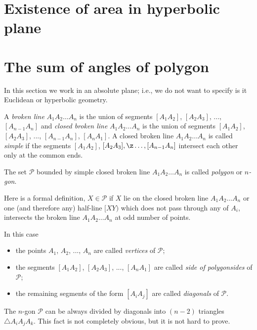 \section*{Existence of area in hyperbolic plane}




\section*{The sum of angles of polygon} 

In this section we work in an absolute plane;
i.e., we do not want to specify is it Euclidean or hyperbolic geometry.

A \emph{broken line} $A_1A_2\dots A_n$
is the union of segments $[A_1A_2]$, $[A_2A_3]$, ..., $[A_{n-1}A_n]$
and  \emph{closed broken line} $A_1A_2\dots A_n$
is the union of segments $[A_1A_2]$, $[A_2A_3]$, ..., $[A_{n-1}A_n]$, $[A_nA_1]$.
A closed broken line  $A_1A_2\dots A_n$ is called \emph{simple} if the segments  $[A_1A_2]$, $[A_2A_3], \z\dots,[A_{n-1}A_n]$ intersect each other only at the common ends.

The set $\mathcal{P}$ bounded by simple closed broken line $A_1A_2\dots A_n$ is called
\emph{polygon} or \emph{$n$-gon}.

Here is a formal definition, $X\in\mathcal{P}$ if $X$ lie on the closed broken line $A_1A_2\dots A_n$ or one (and therefore any) half-line $[XY)$ which does not pass through any of $A_i$, intersects the broken line $A_1A_2\dots A_n$ at odd number of points.

In this case
\begin{itemize}
\item the points $A_1$, $A_2$, ..., $A_n$ are called \emph{vertices} of $\mathcal{P}$;
\item the segments $[A_1A_2]$, $[A_2A_3]$, ..., $[A_{n}A_1]$ 
are called 
\emph{side of polygon}\emph{sides} of $\mathcal{P}$;
\item the remaining segments of the form $[A_iA_j]$ are called  
\emph{diagonals} of $\mathcal{P}$.
\end{itemize}

The  $n$-gon $\mathcal{P}$ can be always divided by diagonals into $(n-2)$ triangles $\triangle A_iA_jA_k$.
This fact is not completely obvious, but it is not hard to prove.

